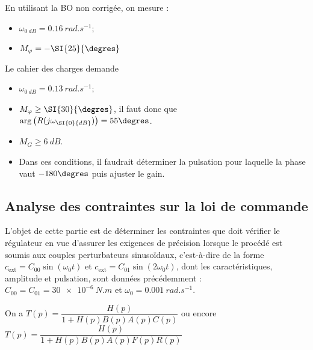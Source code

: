 \ifprof
\begin{corrige}
En utilisant la BO non corrigée, on mesure :
\begin{itemize}
\item $\omega_{\SI{0}{dB}} = \SI{0,16}{rad.s^{-1}}$;
\item $M_{\varphi}=-\SI{25}{\degres}$
\end{itemize}
Le cahier des charges demande 
\begin{itemize}
\item $\omega_{\SI{0}{dB}} = \SI{0,13}{rad.s^{-1}}$;
\item $M_{\varphi}\geq \SI{30}{\degres}$, il faut donc que $\arg\left(R(j\omega_{\SI{0}{dB}}) \right)=55\degres$.
\item $M_{G}\geq \SI{6}{dB}$.
\item Dans ces conditions, il faudrait déterminer la pulsation pour laquelle la phase vaut $-180\degres$ puis ajuster le gain.
\end{itemize}
\end{corrige}
\else
\fi







\subsection{\label{sec:3:B} Analyse des contraintes sur la loi de commande}

\ifprof
\else

L’objet de cette partie est de déterminer les contraintes que doit vérifier le régulateur en vue d’assurer les
exigences de précision lorsque le procédé est soumis aux couples perturbateurs sinusoïdaux, c’est-à-dire de la
forme 
$c_{\text{ext}} = C_{00}\sin(\omega_0 t)$ et 
$c_{\text{ext}} = C_{01} \sin(2\omega_0t)$, 
dont les caractéristiques, amplitude et pulsation, sont données
précédemment : $C_{00} = C_{01} = \SI{30e-6}{N.m}$  et $\omega_0 = \SI{0,001}{rad.s^{-1}}$.
\fi


\ifprof
\begin{corrige}
On a $T(p)=\dfrac{H(p)}{1+H(p)B(p)A(p)C(p)}$ ou encore $T(p)=\dfrac{H(p)}{1+H(p)B(p)A(p)F(p)R(p)}$
\end{corrige}
\else
\fi

